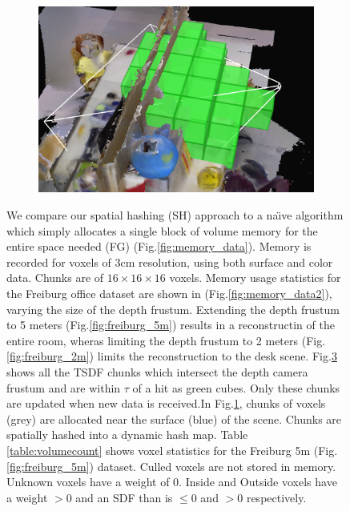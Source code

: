 \documentclass[10pt,twocolumn,letterpaper]{article}
\newcommand{\figref}[1]{Fig.\ref{#1}}
\begin{document}
\begin{figure}
\begin{minipage}{0.45\linewidth}
\begin{subfigure}{0.45\linewidth}
 	      \caption{}
 	  	\label{fig:chunks} 
 	  \end{subfigure} 
 	  \begin{subfigure}{0.45\linewidth} \centering
	      \includegraphics[width=1.0\textwidth]{img/frustum_cull}
	      \caption{}
	 	 \label{fig:frustum_cull}
	  \end{subfigure}
   \end{minipage}
  \caption{ We compare our spatial hashing (SH)
      approach to a na\"{\i}ve algorithm which simply allocates a single
      block of volume memory for the entire space needed (FG)
      (\figref{fig:memory_data}). Memory is recorded for voxels of 3cm
      resolution, using both surface and color data. Chunks are of $16 \times 16 \times 16$ voxels. Memory
      usage statistics for the Freiburg \cite{FREIBURG} office dataset are shown
      in (\figref{fig:memory_data2}), varying the size of the depth frustum.
      Extending the depth frustum to 5 meters (\figref{fig:freiburg_5m}) results in a reconstructin of the entire
      room, wheras limiting the depth frustum to 2 meters
      (\figref{fig:freiburg_2m}) limits the reconstruction to the desk scene.
      \figref{fig:frustum_cull} shows all the TSDF chunks which intersect the
      depth camera frustum  and are within $\tau$ of a hit as green cubes. Only
      these chunks are updated when new data is received.In \figref{fig:chunks}, chunks of voxels (grey) are allocated near
  the surface (blue) of the scene. Chunks are spatially hashed \cite{SpatialHashing} into a
      dynamic hash map. Table \ref{table:volumecount} shows voxel statistics for
      the Freiburg 5m (\figref{fig:freiburg_5m}) dataset. Culled voxels are not stored in
       memory. Unknown voxels have a weight of 0. Inside and Outside voxels have
      a weight $> 0$ and an SDF than is $\leq 0$ and $> 0$ respectively. }
\end{figure} 
\end{document}
